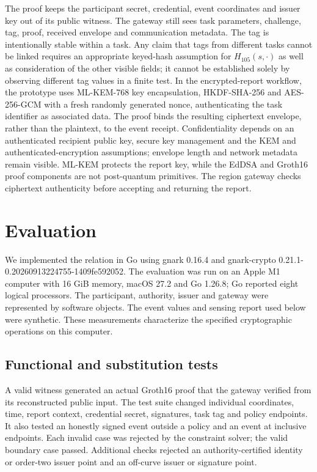 \documentclass[pdflatex,iicol,sn-mathphys-num]{sn-jnl}
\begin{document}
The proof keeps the participant secret, credential, event coordinates and issuer key out of its public witness. The gateway still sees task parameters, challenge, tag, proof, received envelope and communication metadata. The tag is intentionally stable within a task. Any claim that tags from different tasks cannot be linked requires an appropriate keyed-hash assumption for $H_{105}(s,\cdot)$ as well as consideration of the other visible fields; it cannot be established solely by observing different tag values in a finite test. In the encrypted-report workflow, the prototype uses ML-KEM-768 key encapsulation, HKDF-SHA-256 and AES-256-GCM with a fresh randomly generated nonce, authenticating the task identifier as associated data. The proof binds the resulting ciphertext envelope, rather than the plaintext, to the event receipt. Confidentiality depends on an authenticated recipient public key, secure key management and the KEM and authenticated-encryption assumptions; envelope length and network metadata remain visible. ML-KEM protects the report key, while the EdDSA and Groth16 proof components are not post-quantum primitives. The region gateway checks ciphertext authenticity before accepting and returning the report.


\section{Evaluation}
\label{sec:evaluation}

We implemented the relation in Go using gnark 0.16.4 and gnark-crypto 0.21.1-0.20260913224755-1409fe592052. The evaluation was run on an Apple M1 computer with 16 GiB memory, macOS 27.2 and Go 1.26.8; Go reported eight logical processors. The participant, authority, issuer and gateway were represented by software objects. The event values and sensing report used below were synthetic. These measurements characterize the specified cryptographic operations on this computer.

\subsection{Functional and substitution tests}
A valid witness generated an actual Groth16 proof that the gateway verified from its reconstructed public input. The test suite changed individual coordinates, time, report context, credential secret, signatures, task tag and policy endpoints. It also tested an honestly signed event outside a policy and an event at inclusive endpoints. Each invalid case was rejected by the constraint solver; the valid boundary case passed. Additional checks rejected an authority-certified identity or order-two issuer point and an off-curve issuer or signature point.
\end{document}
